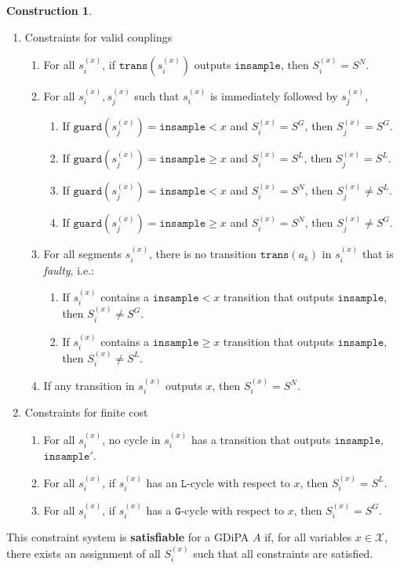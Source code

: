 \documentclass[12pt]{article}
\newcommand{\gguard}[1][x]{\texttt{insample}\geq #1}
\newcommand{\lguard}[1][x]{\texttt{insample} < #1}
\newcommand{\guard}{\texttt{guard}}
\newcommand{\trans}{\texttt{trans}}
\theoremstyle{definition}
\newtheorem{const}[thm]{Construction}
\begin{document}
\begin{const}
    \begin{enumerate}
        \item Constraints for valid couplings\begin{enumerate}
            \item For all $s_i^{(x)}$, if $\trans(s_i^{(x)})$ outputs $\texttt{insample}$, then $S_i^{(x)} = S^N$.
            \item For all $s_i^{(x)}, s_j^{(x)}$ such that $s_i^{(x)}$ is immediately followed by $s_j^{(x)}$, \begin{enumerate}
                \item If $\guard(s_j^{(x)})=\lguard$ and $S_i^{(x)} = S^G$, then $S_j^{(x)} = S^G$. 
                \item If $\guard(s_j^{(x)}) = \gguard$ and $S_i^{(x)} = S^L$, then $S_j^{(x)} = S^L$.
                \item If $\guard(s_j^{(x)}) = \lguard$ and $S_i^{(x)} = S^N$, then $S_j^{(x)}\neq S^L$.
                \item If $\guard(s_j^{(x)}) = \gguard$ and $S_i^{(x)} = S^N$, then $S_j^{(x)}\neq S^G$.
            \end{enumerate}
            \item For all segments $s_i^{(x)}$, there is no transition $\trans(a_k)$ in $s_i^{(x)}$ that is \textit{faulty}, i.e.:\begin{enumerate}
                \item If $s_i^{(x)}$ contains a $\lguard$ transition that outputs $\texttt{insample}$, then $S_i^{(x)} \neq S^G$.
                \item If $s_i^{(x)}$ contains a $\gguard$ transition that outputs $\texttt{insample}$, then $S_i^{(x)} \neq S^L$.
            \end{enumerate}
            \item If any transition in $s_i^{(x)}$ outputs $x$, then $S_i^{(x)} = S^N$. 
        \end{enumerate}
        \item Constraints for finite cost\begin{enumerate}
            \item For all $s_i^{(x)}$, no cycle in $s_i^{(x)}$ has a transition that outputs $\texttt{insample}$, $\texttt{insample}'$. 
            \item For all $s_i^{(x)}$, if $s_i^{(x)}$ has an $\texttt{L}$-cycle with respect to $x$, then $S_i^{(x)} = S^L$.
            \item For all $s_i^{(x)}$, if $s_i^{(x)}$ has a $\texttt{G}$-cycle with respect to $x$, then $S_i^{(x)} = S^G$. 
        \end{enumerate}
    \end{enumerate}

    This constraint system is \textbf{satisfiable} for a GDiPA $A$ if, for all variables $x\in \mathcal{X}$, there exists an assignment of all $S_i^{(x)}$ such that all constraints are satisfied. 
\end{const}
\end{document}
